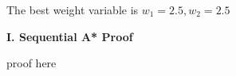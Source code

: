 \documentclass[12pt, letterpaper]{article}
\begin{document}
\noindent The best weight variable is $ w_1=2.5,w_2=2.5 $

\medskip



\pagebreak %

\noindent \textbf{I. Sequential A* Proof}

proof here
\end{document}
